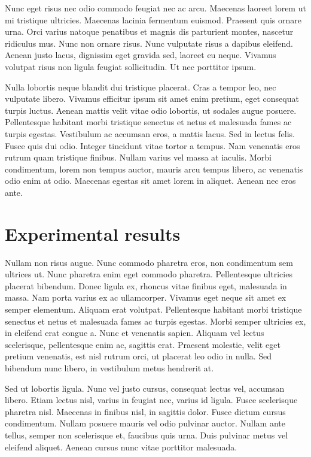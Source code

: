 \documentclass{article}
\begin{document}
Nunc eget risus nec odio commodo feugiat nec ac arcu. Maecenas laoreet lorem ut mi tristique ultricies. Maecenas lacinia fermentum euismod. Praesent quis ornare urna. Orci varius natoque penatibus et magnis dis parturient montes, nascetur ridiculus mus. Nunc non ornare risus. Nunc vulputate risus a dapibus eleifend. Aenean justo lacus, dignissim eget gravida sed, laoreet eu neque. Vivamus volutpat risus non ligula feugiat sollicitudin. Ut nec porttitor ipsum.

Nulla lobortis neque blandit dui tristique placerat. Cras a tempor leo, nec vulputate libero. Vivamus efficitur ipsum sit amet enim pretium, eget consequat turpis luctus. Aenean mattis velit vitae odio lobortis, ut sodales augue posuere. Pellentesque habitant morbi tristique senectus et netus et malesuada fames ac turpis egestas. Vestibulum ac accumsan eros, a mattis lacus. Sed in lectus felis. Fusce quis dui odio. Integer tincidunt vitae tortor a tempus. Nam venenatis eros rutrum quam tristique finibus. Nullam varius vel massa at iaculis. Morbi condimentum, lorem non tempus auctor, mauris arcu tempus libero, ac venenatis odio enim at odio. Maecenas egestas sit amet lorem in aliquet. Aenean nec eros ante.
\section{Experimental results}
Nullam non risus augue. Nunc commodo pharetra eros, non condimentum sem ultrices ut. Nunc pharetra enim eget commodo pharetra. Pellentesque ultricies placerat bibendum. Donec ligula ex, rhoncus vitae finibus eget, malesuada in massa. Nam porta varius ex ac ullamcorper. Vivamus eget neque sit amet ex semper elementum. Aliquam erat volutpat. Pellentesque habitant morbi tristique senectus et netus et malesuada fames ac turpis egestas. Morbi semper ultricies ex, in eleifend erat congue a. Nunc et venenatis sapien. Aliquam vel lectus scelerisque, pellentesque enim ac, sagittis erat. Praesent molestie, velit eget pretium venenatis, est nisl rutrum orci, ut placerat leo odio in nulla. Sed bibendum nunc libero, in vestibulum metus hendrerit at.

Sed ut lobortis ligula. Nunc vel justo cursus, consequat lectus vel, accumsan libero. Etiam lectus nisl, varius in feugiat nec, varius id ligula. Fusce scelerisque pharetra nisl. Maecenas in finibus nisl, in sagittis dolor. Fusce dictum cursus condimentum. Nullam posuere mauris vel odio pulvinar auctor. Nullam ante tellus, semper non scelerisque et, faucibus quis urna. Duis pulvinar metus vel eleifend aliquet. Aenean cursus nunc vitae porttitor malesuada.
\end{document}
